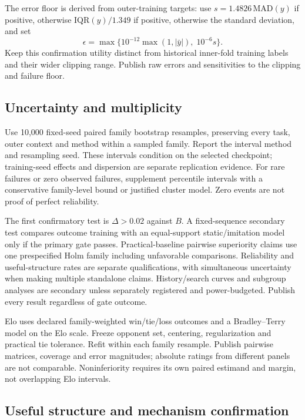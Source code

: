 The error floor is derived from outer-training targets: use
$s=1.4826\,\mathrm{MAD}(y)$ if positive, otherwise
$\mathrm{IQR}(y)/1.349$ if positive, otherwise the standard deviation, and set
\begin{equation*}
\epsilon=\max\{10^{-12}\max(1,|\bar y|),\;10^{-6}s\}.
\end{equation*}
Keep this confirmation utility distinct from historical inner-fold training
labels and their wider clipping range. Publish raw errors and sensitivities to
the clipping and failure floor.

\subsection{Uncertainty and multiplicity}

Use 10,000 fixed-seed paired family bootstrap resamples, preserving every task,
outer context and method within a sampled family. Report the interval method
and resampling seed. These intervals condition on the selected checkpoint;
training-seed effects and dispersion are separate replication evidence. For rare
failures or zero observed failures, supplement percentile intervals with a
conservative family-level bound or justified cluster model. Zero events are not
proof of perfect reliability.

The first confirmatory test is $\Delta>0.02$ against $B$. A fixed-sequence
secondary test compares outcome training with an equal-support static/imitation
model only if the primary gate passes. Practical-baseline pairwise superiority
claims use one prespecified Holm family including unfavorable comparisons.
Reliability and useful-structure rates are separate qualifications, with
simultaneous uncertainty when making multiple standalone claims. History/search
curves and subgroup analyses are secondary unless separately registered and
power-budgeted. Publish every result regardless of gate outcome.

Elo uses declared family-weighted win/tie/loss outcomes and a Bradley--Terry
model on the Elo scale. Freeze opponent set, centering, regularization and
practical tie tolerance. Refit within each family resample. Publish pairwise
matrices, coverage and error magnitudes; absolute ratings from different panels
are not comparable. Noninferiority requires its own paired estimand and margin,
not overlapping Elo intervals.

\subsection{Useful structure and mechanism confirmation}

